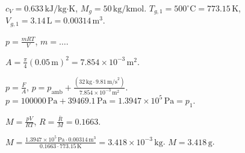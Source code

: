 \( c_V = 0.633 \, \text{kJ/kg·K} \), \( M_g = 50 \, \text{kg/kmol} \).  
\( T_{g,1} = 500^\circ \text{C} = 773.15 \, \text{K} \), \( V_{g,1} = 3.14 \, \text{L} = 0.00314 \, \text{m}^3 \).  

\( p = \frac{mRT}{V} \), \( m = \dots \).  

\( A = \frac{\pi}{4} (0.05 \, \text{m})^2 = 7.854 \times 10^{-3} \, \text{m}^2 \).  

\( p = \frac{F}{A} \), \( p = p_{\text{amb}} + \frac{(32 \, \text{kg} \cdot 9.81 \, \text{m/s}^2)}{7.854 \times 10^{-3} \, \text{m}^2} \).  
\( p = 100000 \, \text{Pa} + 39469.1 \, \text{Pa} = 1.3947 \times 10^5 \, \text{Pa} = p_1 \).  

\( M = \frac{pV}{RT} \), \( R = \frac{\bar{R}}{M} = 0.1663 \).  

\( M = \frac{1.3947 \times 10^5 \, \text{Pa} \cdot 0.00314 \, \text{m}^3}{0.1663 \cdot 773.15 \, \text{K}} = 3.418 \times 10^{-3} \, \text{kg} \).  
\( M = 3.418 \, \text{g} \).